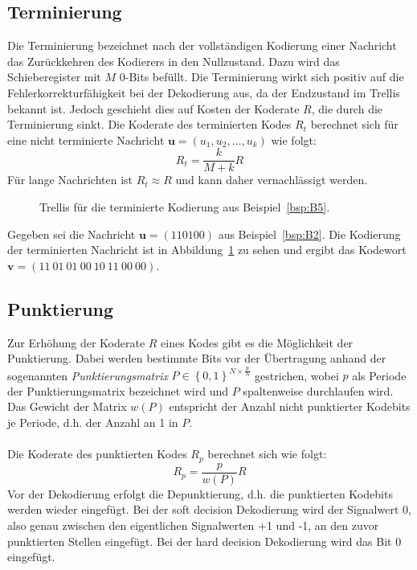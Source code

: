 \subsection{Terminierung}
\label{kapitel:grundlageen_terminierung}
Die Terminierung bezeichnet nach der vollständigen Kodierung einer Nachricht das Zurückkehren des Kodierers in den Nullzustand. Dazu wird das Schieberegister mit $M$ 0-Bits befüllt. Die Terminierung wirkt sich positiv auf die Fehlerkorrekturfähigkeit bei der Dekodierung aus, da der Endzustand im Trellis bekannt ist. Jedoch geschieht dies auf Kosten der Koderate $R$, die durch die Terminierung sinkt. Die Koderate des terminierten Kodes $R_{t}$ berechnet sich für eine nicht terminierte Nachricht $\mathbf{u}=\left( u_{1},u_{2},\dots ,u_{k}\right)$ wie folgt:
\begin{equation}
R_{t}=\frac{k}{M+k}R
\end{equation}
Für lange Nachrichten ist $R_{t}\approx R$ und kann daher vernachlässigt werden.
\begin{figure}[t]

\caption{Trellis für die terminierte Kodierung aus Beispiel~\ref{bsp:B5}.}
\label{abb:trellis_terminiert}
\end{figure}
\begin{beispiel}
Gegeben sei die Nachricht $\mathbf{u}=\left( 110100\right)$ aus Beispiel~\ref{bsp:B2}. Die Kodierung der terminierten Nachricht ist in Abbildung~\ref{abb:trellis_terminiert} zu sehen und ergibt das Kodewort $\mathbf{v}=\left( 11~01~01~00~10~11~00~00\right)$.
\label{bsp:B5}
\end{beispiel}

\subsection{Punktierung}
\label{kapitel:grundlagen_punktierung}
Zur Erhöhung der Koderate $R$ eines Kodes gibt es die Möglichkeit der Punktierung. Dabei werden bestimmte Bits vor der Übertragung anhand der sogenannten \emph{Punktierungsmatrix} $P \in {\left\lbrace 0,1 \right\rbrace}^{N\times \frac{p}{N}}$ gestrichen, wobei $p$ als Periode der Punktierungsmatrix bezeichnet wird und $P$ spaltenweise durchlaufen wird. Das Gewicht der Matrix $w(P)$ entspricht der Anzahl nicht punktierter Kodebits je Periode, d.h. der Anzahl an 1 in $P$.~\cite[S. 218]{schonfeld2012informations}
\\
\\
Die Koderate des punktierten Kodes $R_{p}$ berechnet sich wie folgt:
\begin{equation}
R_{p}=\frac{p}{w(P)}R
\end{equation}
Vor der Dekodierung erfolgt die Depunktierung, d.h. die punktierten Kodebits werden wieder eingefügt. Bei der soft decision Dekodierung wird der Signalwert 0, also genau zwischen den eigentlichen Signalwerten +1 und -1, an den zuvor punktierten Stellen eingefügt. Bei der hard decision Dekodierung wird das Bit 0 eingefügt.

